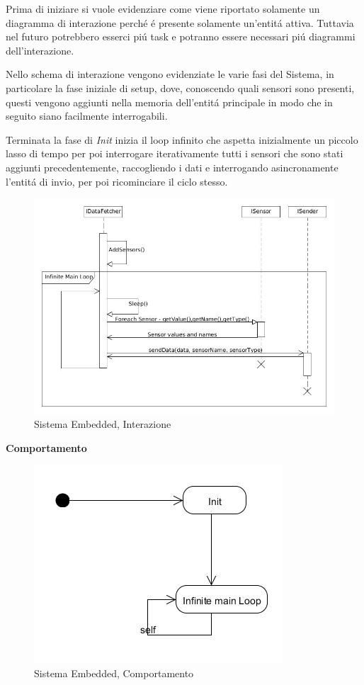Prima di iniziare si vuole evidenziare come viene riportato solamente un diagramma di interazione perch\'e \'e presente solamente un'entit\'a attiva. Tuttavia nel futuro potrebbero esserci pi\'u task e potranno essere necessari pi\'u diagrammi dell'interazione.

Nello schema di interazione vengono evidenziate le varie fasi del Sistema, in particolare la fase iniziale di setup, dove, conoscendo quali sensori sono presenti, questi vengono aggiunti nella memoria dell'entit\'a principale in modo che in seguito siano facilmente interrogabili.

Terminata la fase di \textit{Init} inizia il loop infinito che aspetta inizialmente un piccolo lasso di tempo per poi interrogare iterativamente tutti i sensori che sono stati aggiunti precedentemente, raccogliendo i dati e interrogando asincronamente l'entit\'a di invio, per poi ricominciare il ciclo stesso.

\begin{figure}[h]
\centering
\includegraphics[scale=0.4]{Figures/DomainModel/EmbeddedSystem/Interaction}
\caption{Sistema Embedded, Interazione}
\end{figure}

\newpage

\begin{center}
\textbf{Comportamento}
\end{center}

\begin{figure}[h]
\centering
\includegraphics[scale=0.5]{Figures/DomainModel/EmbeddedSystem/Behaviour}
\caption{Sistema Embedded, Comportamento}
\end{figure}


